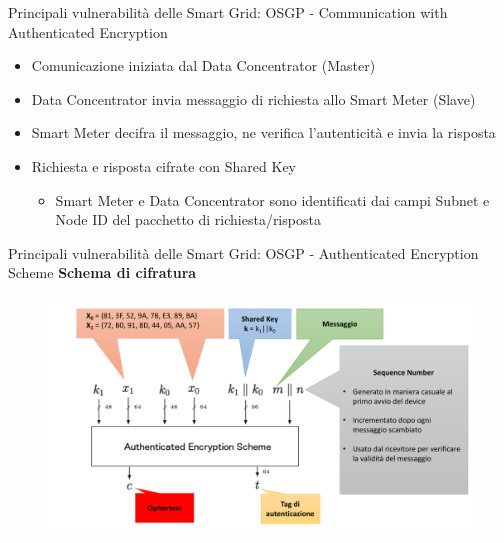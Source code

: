 \begin{frame}{Principali vulnerabilità delle Smart Grid: OSGP - Communication with Authenticated Encryption}
	\begin{itemize}[<+- | alert@+>]
		\item Comunicazione iniziata dal Data Concentrator (Master)
		\item Data Concentrator invia messaggio di richiesta allo Smart Meter (Slave)
		\item Smart Meter decifra il messaggio, ne verifica l'autenticità e invia la risposta
		\item Richiesta e risposta cifrate con Shared Key
		\begin{itemize}
			\item Smart Meter e Data Concentrator sono identificati dai campi Subnet e Node ID del pacchetto di richiesta/risposta
		\end{itemize}
	\end{itemize}
\end{frame}

\begin{frame}{Principali vulnerabilità delle Smart Grid: OSGP - Authenticated Encryption Scheme}
	\textbf{Schema di cifratura}
	\begin{figure}[h]
		\includegraphics[scale=0.3,cfbox=blue_slides 1pt 0pt]{imgs/schemes/blackbox-1.png}
	\end{figure}
\end{frame}

